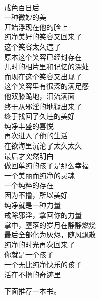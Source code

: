 \begin{poem}
    \begin{multicols}{2}
        \begin{center}~\\
            戒色百日后 \\ 一种微妙的美 \\ 开始浮现在他的脸上 \\ 纯净美好的笑容又回来了 \\ 这个笑容太久违了 \\ 原本这个笑容已经封存在 \\ 儿时的相片里和记忆的深处 \\ 而现在这个笑容又出现了 \\ 这个笑容里有很深的满足感 \\ 他双膝跪地，泪流满面 \\ 终于从邪淫的地狱出来了 \\ 终于找回了久违的美好 \\ 纯净丰盛的喜悦 \\ 再次进入了他的生活 \\ 在欲海里沉沦了太久太久 \\ 最后才突然明白 \\ 做回单纯的孩子是那么幸福 \\ 一个美丽而纯净的灵魂 \\ 一个纯粹的存在 \\ 因为不撸，所以美好 \\ 纯净就是一种力量 \\ 戒除邪淫，拿回你的力量 \\ 掌中，堕落的岁月在静静燃烧 \\ 最后全部化为灰烬，随风飘散 \\ 纯净的时光再次回来了 \\ 你就是一个孩子 \\ 一个无比纯净快乐的孩子 \\ 活在不撸的奇迹里
        \end{center}
    \end{multicols}
\end{poem}

下面推荐一本书。

